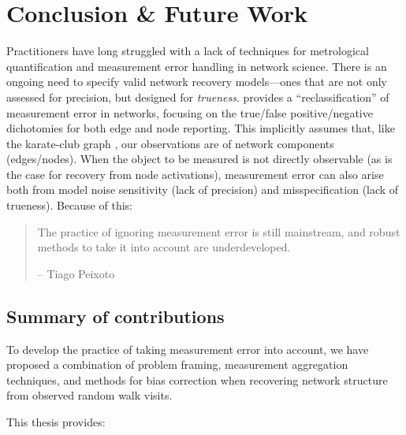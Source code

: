 \documentclass[%
	12pt,
		oneside,
		letterpaper
]{book}
\begin{document}

\chapter{Conclusion \& Future Work}\label{sec-conclusion}

Practitioners have long struggled with a lack of techniques for
metrological quantification and measurement error handling in network
science. There is an ongoing need to specify valid network recovery
models---ones that are not only assessed for precision, but designed for
\emph{trueness}. \textcite{Measurementerrornetwork_Wang2012} provides a
``reclassification'' of measurement error in networks, focusing on the
true/false positive/negative dichotomies for both edge and node
reporting. This implicitly assumes that, like the karate-club graph
\autocite{InformationFlowModel_Zachary1977}, our observations are of
network components (edges/nodes). When the object to be measured is not
directly observable (as is the case for recovery from node activations),
measurement error can also arise both from model noise sensitivity (lack
of precision) and misspecification (lack of trueness). Because of this:

\singlespacing

\begin{quote}
The practice of ignoring measurement error is still mainstream, and
robust methods to take it into account are underdeveloped.

\hfill -- Tiago Peixoto
\autocite{ReconstructingNetworksUnknown_Peixoto2018}
\end{quote}

\doublespacing

\section{Summary of contributions}\label{summary-of-contributions}

To develop the practice of taking measurement error into account, we
have proposed a combination of problem framing, measurement aggregation
techniques, and methods for bias correction when recovering network
structure from observed random walk visits.

This thesis provides:
\end{document}
